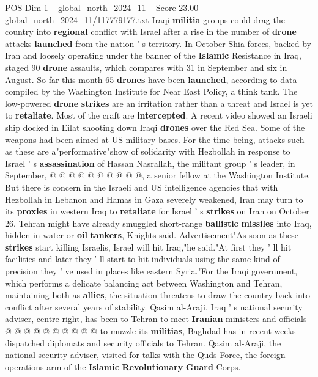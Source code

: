 \begin{textsample}{POS Dim 1 – global\_north\_2024\_11 – Score 23.00 – global\_north\_2024\_11/117779177.txt}  \label{ex:f1_pos_232}
Iraqi \textbf{militia} groups could drag the country into \textbf{regional} conflict with Israel after a rise in the number of \textbf{drone} attacks \textbf{launched} from the nation ' s territory.
In October Shia forces, backed by Iran and loosely operating under the banner of the \textbf{Islamic} Resistance in Iraq, staged 90 \textbf{drone} assaults, which compares with 31 in September and six in August.
So far this month 65 \textbf{drones} have been \textbf{launched}, according to data compiled by the Washington Institute for Near East Policy, a think tank.
The low-powered \textbf{drone} \textbf{strikes} are an irritation rather than a threat and Israel is yet to \textbf{retaliate}.
Most of the craft are \textbf{intercepted}.
A recent video showed an Israeli ship docked in Eilat shooting down Iraqi \textbf{drones} over the Red Sea.
Some of the weapons had been aimed at US military bases.
For the time being, attacks such as these are a"performative"show of solidarity with Hezbollah in response to Israel ' s \textbf{assassination} of Hassan Nasrallah, the militant group ' s leader, in September, @ @ @ @ @ @ @ @ @ @, a senior fellow at the Washington Institute.
But there is concern in the Israeli and US intelligence agencies that with Hezbollah in Lebanon and Hamas in Gaza severely weakened, Iran may turn to its \textbf{proxies} in western Iraq to \textbf{retaliate} for Israel ' s \textbf{strikes} on Iran on October 26.
Tehran might have already smuggled short-range \textbf{ballistic} \textbf{missiles} into Iraq, hidden in water or \textbf{oil} \textbf{tankers}, Knights said.
Advertisement"As soon as these \textbf{strikes} start killing Israelis, Israel will hit Iraq,"he said."At first they ' ll hit facilities and later they ' ll start to hit individuals using the same kind of precision they ' ve used in places like eastern Syria."For the Iraqi government, which performs a delicate balancing act between Washington and Tehran, maintaining both as \textbf{allies}, the situation threatens to draw the country back into conflict after several years of stability.
Qasim al-Araji, Iraq ' s national security adviser, centre right, has been to Tehran to meet \textbf{Iranian} ministers and officials @ @ @ @ @ @ @ @ @ @ to muzzle its \textbf{militias}, Baghdad has in recent weeks dispatched diplomats and security officials to Tehran.
Qasim al-Araji, the national security adviser, visited for talks with the Quds Force, the foreign operations arm of the \textbf{Islamic} \textbf{Revolutionary} \textbf{Guard} Corps.

\end{textsample}

